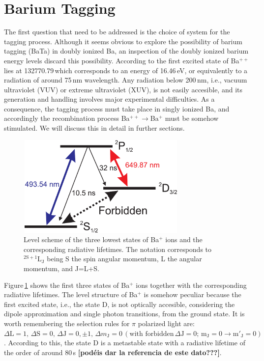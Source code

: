 \section{Barium Tagging}\label{BaTa}

The first question that need to be addressed is the choice of system for the tagging process. Although it seems obvious to explore the possibility of barium tagging (BaTa) in doubly ionized Ba, an inspection of the doubly ionized barium energy levels discard this possibility.  According to \cite{Sansonetti10} the first excited state of Ba$^{++}$ lies at 132770.79\,\waven which corresponds to an energy of 16.46\,eV, or equivalently to a radiation of around 75\,nm wavelength. Any radiation below 200\,nm, i.e., vacuum ultraviolet (VUV) or extreme ultraviolet (XUV), is not easily accesible, and its generation and handling involves major experimental difficulties. As a consequence, the tagging process must take place in singly ionized Ba, and accordingly the recombination process Ba$^{++}\rightarrow$Ba$^{+}$ must be somehow stimulated. We will discuss this in detail in further sections. 

\begin{figure}[ht!]
\begin{center}
\includegraphics[width=8.3cm, height=5cm]{imgs/levelscheme.pdf}
\caption{\label{levelscheme} Level scheme of the three lowest states of Ba$^+$ ions and the corresponding radiative lifetimes. The notation corresponds to $^{2\mathrm{S}+1}\mathrm{L}_\mathrm{J}$ being S the spin angular momentum, L the angular momentum, and J=L+S.}
\end{center}
\end{figure}

Figure\,\ref{levelscheme} shows the first three states of Ba$^+$ ions together with the corresponding radiative lifetimes. The level structure of Ba$^+$ is somehow peculiar because the first excited state, i.e., the state D, is not optically accesible, considering the dipole approximation and single photon transitions, from the ground state.  It is worth remembering the selection rules for $\pi$ polarized light are: $ \Delta\mathrm{L}=1, \,\Delta\mathrm{S}=0, \,\Delta\mathrm{J}=0,\pm1, \,\Delta m_\mathrm{J}=0\,(\text{with forbidden}\, \Delta\mathrm{J}=0;\,\mathrm{m_J}=0\rightarrow\mathrm{m'_J}=0)$.  According to this, the state D is a metastable state with a radiative lifetime of the order of around 80\,s \textbf{[pod\'eis dar la referencia de este dato???]}. 

